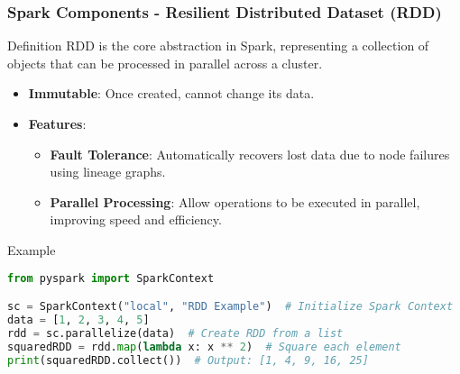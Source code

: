\documentclass[aspectratio=169]{beamer}
\begin{document}
\begin{frame}[fragile]
    \frametitle{Spark Components - Resilient Distributed Dataset (RDD)}
    \begin{block}{Definition}
        RDD is the core abstraction in Spark, representing a collection of objects that can be processed in parallel across a cluster.
    \end{block}
    \begin{itemize}
        \item \textbf{Immutable}: Once created, cannot change its data.
        \item \textbf{Features}:
        \begin{itemize}
            \item \textbf{Fault Tolerance}: Automatically recovers lost data due to node failures using lineage graphs.
            \item \textbf{Parallel Processing}: Allow operations to be executed in parallel, improving speed and efficiency.
        \end{itemize}
    \end{itemize}
    \begin{block}{Example}
        \begin{lstlisting}[language=Python]
from pyspark import SparkContext

sc = SparkContext("local", "RDD Example")  # Initialize Spark Context
data = [1, 2, 3, 4, 5]
rdd = sc.parallelize(data)  # Create RDD from a list
squaredRDD = rdd.map(lambda x: x ** 2)  # Square each element
print(squaredRDD.collect())  # Output: [1, 4, 9, 16, 25]
        \end{lstlisting}
    \end{block}
\end{frame}
\end{document}
